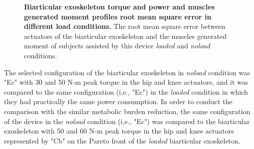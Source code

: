 \documentclass[10pt,letterpaper]{article}
\begin{document}
\begin{figure}[ht!]
	\centering
	\hfil
	\vspace{1mm}
	\caption{\small{\textbf{Biarticular exoskeleton torque and power and muscles generated moment profiles root mean square error in different load conditions.} The root mean square error between actuators of the biarticular exoskeleton and the muscles generated moment of subjects assisted by this device {\it loaded} and {\it noload} conditions.}}
	\label{Fig_Case03_RMSE}
\end{figure}
The selected configuration of the biarticular exoskeleton in {\it noload} condition was "Ec" with 30 and 50 N-m peak torque in the hip and knee actuators, and it was compared to the same configuration (i.e., "Ec") in the {\it loaded} condition in which they had practically the same power consumption. In order to conduct the comparison with the similar metabolic burden reduction, the same configuration of the device in the {\it noload} condition (i.e., "Ec") was compared to the biarticular exoskeleton with 50 and 60 N-m peak torque in the hip and knee actuators represented by "Cb" on the Pareto front of the {\it loaded} biarticular exoskeleton.\\
\end{document}
